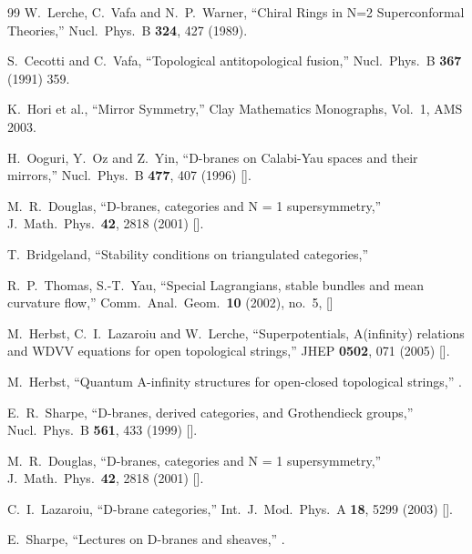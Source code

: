 \begin{thebibliography}{99}
W.~Lerche, C.~Vafa and N.~P.~Warner,
``Chiral Rings in N=2 Superconformal Theories,''
Nucl.\ Phys.\  B {\bf 324}, 427 (1989).

 S.~Cecotti and C.~Vafa,
``Topological antitopological fusion,''
Nucl.\ Phys.\  B {\bf 367} (1991) 359.

K.~Hori et al.,
``Mirror Symmetry,''
Clay Mathematics Monographs, Vol.~1, AMS 2003.

H.~Ooguri, Y.~Oz and Z.~Yin,
``D-branes on Calabi-Yau spaces and their mirrors,''
Nucl.\ Phys.\  B {\bf 477}, 407 (1996)
[].

 M.~R.~Douglas,
  ``D-branes, categories and N = 1 supersymmetry,''
  J.\ Math.\ Phys.\  {\bf 42}, 2818 (2001)
  [].

T.~Bridgeland,
``Stability conditions on triangulated categories,''

R.~P.~Thomas, S.-T.~Yau,
``Special Lagrangians, stable bundles and mean curvature flow,''
Comm.\ Anal.\ Geom.\ {\bf 10} (2002), no.~5, 
[]

M.~Herbst, C.~I.~Lazaroiu and W.~Lerche,
``Superpotentials, A(infinity) relations and WDVV equations for open
topological strings,''
JHEP {\bf 0502}, 071 (2005)
[].

M.~Herbst,\quad
``Quantum A-infinity structures for open-closed topological strings,''
.

E.~R.~Sharpe,
 ``D-branes, derived categories, and Grothendieck groups,''
  Nucl.\ Phys.\  B {\bf 561}, 433 (1999)
  [].

M.~R.~Douglas,
``D-branes, categories and N = 1 supersymmetry,''
J.\ Math.\ Phys.\  {\bf 42}, 2818 (2001)
[].

C.~I.~Lazaroiu,
``D-brane categories,''
Int.\ J.\ Mod.\ Phys.\  A {\bf 18}, 5299 (2003)
[].

  E.~Sharpe,
  ``Lectures on D-branes and sheaves,''
  .


\end{thebibliography}
